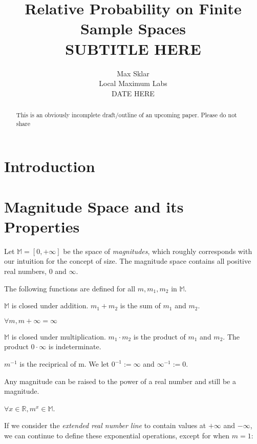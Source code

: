 \documentclass[twoside]{article}
\begin{document}
\parindent=0in
\parskip=12pt


\title{
  Relative Probability on Finite Sample Spaces \\
  \large{
    SUBTITLE HERE
  }
}

\author{Max Sklar\\ Local Maximum Labs \\ DATE HERE}
\date{}

\maketitle
\thispagestyle{empty}

\begin{abstract}
This is an obviously incomplete draft/outline of an upcoming paper. Please do not share
\end{abstract}

\section{Introduction}

\section{Magnitude Space and its Properties}

Let \(\mathbb{M} = [0, +\infty]\) be the space of \textit{magnitudes}, which roughly corresponds with our intuition for the concept of size. The magnitude space contains all positive real numbers, \(0\) and \(\infty\).

The following functions are defined for all \(m, m_1, m_2\) in \(\mathbb{M}\).

\(\mathbb{M}\) is closed under addition. \(m_1 + m_2\) is the sum of \(m_1\) and \(m_2\).

\(\forall m, m + \infty = \infty\)

\(\mathbb{M}\) is closed under multiplication. \(m_1 \cdot m_2\) is the product of \(m_1\) and \(m_2\). The product \(0 \cdot \infty\) is indeterminate.

\(m^{-1}\) is the reciprical of m. We let \(0^{-1} := \infty\) and \(\infty^{-1} := 0\).

Any magnitude can be raised to the power of a real number and still be a magnitude.

\(\forall x \in \mathbb{R}, m^x \in \mathbb{M}\).

If we consider the \textit{extended real number line} to contain values at \(+\infty\) and \(-\infty\), we can continue to define these exponential operations, except for when \(m = 1\):
\end{document}
